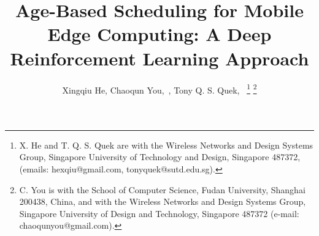 \documentclass[lettersize, journal]{IEEEtran}
\begin{document}



\title{Age-Based Scheduling for Mobile Edge Computing: A Deep Reinforcement Learning Approach}

\author{
  Xingqiu He,
  Chaoqun You,~,
  Tony Q. S. Quek,~
  \thanks{X. He and T. Q. S. Quek are with the Wireless Networks and Design Systems Group,
    Singapore University of Technology and Design, Singapore 487372,
    (emails: hexqiu@gmail.com, tonyquek@sutd.edu.sg).
  }
  \thanks{C. You is with the School of Computer Science, Fudan University, Shanghai 200438, China, 
  and with the Wireless Networks and Design Systems Group, Singapore University of Design and Technology, 
  Singapore 487372 (e-mail: chaoqunyou@gmail.com).}
}


\end{document}
